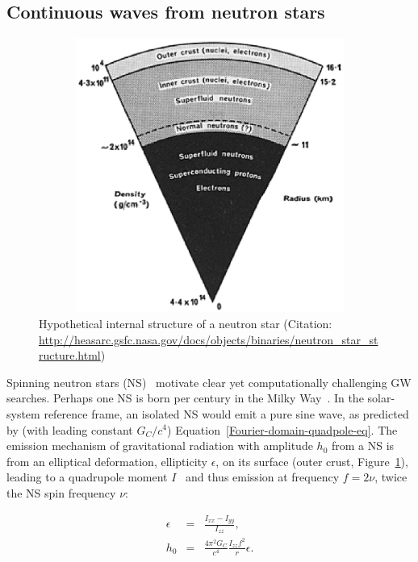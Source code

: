         \subsection{Continuous waves from neutron stars}
        \label{continuous_waves}

	\begin{figure}
	\begin{center}
	\includegraphics[height=90mm, width=120mm]{neutron_star_structure.eps}
	\caption{Hypothetical internal structure of a neutron star (Citation: \url{http://heasarc.gsfc.nasa.gov/docs/objects/binaries/neutron_star_structure.html})} 
	\label{neutron_star_structure}
	\end{center}
	\end{figure}


Spinning neutron stars (NS)~\cite{Prix2006} motivate clear yet computationally challenging GW searches.
Perhaps one NS is born per century in the Milky Way~\cite{NarayanOstriker1990}.
In the solar-system reference frame, an isolated NS would emit a pure sine wave, as predicted by (with leading constant $G_C/c^4$) Equation~\ref{Fourier-domain-quadpole-eq}.
        The emission mechanism of gravitational radiation with amplitude $h_0$ from a NS is from an elliptical deformation, ellipticity $\epsilon$, on its surface (outer crust, Figure~\ref{neutron_star_structure}), leading to a quadrupole moment $I$~\cite{Zimmermann1979,LSCPulsar2006} and thus emission at frequency $f = 2\nu$, twice the NS spin frequency $\nu$:

        \begin{eqnarray}
        \epsilon &=& \frac{I_{xx} - I_{yy}}{I_{zz}}, \\
        h_0 &=& \frac{4 \pi^2 G_C}{c^4} \frac{I_{zz} f^2}{r} \epsilon.
        \end{eqnarray}


